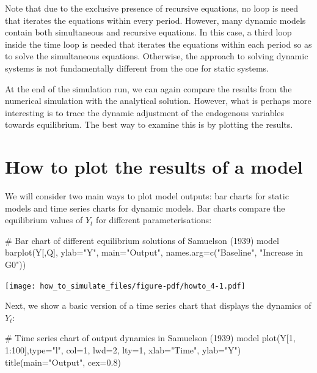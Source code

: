 \documentclass[
  letterpaper,
  DIV=11,
  numbers=noendperiod]{scrreprt}
\newenvironment{Shaded}{\begin{snugshade}}{\end{snugshade}}
\newcommand{\AttributeTok}[1]{\textcolor[rgb]{0.40,0.45,0.13}{#1}}
\newcommand{\CommentTok}[1]{\textcolor[rgb]{0.37,0.37,0.37}{#1}}
\newcommand{\DecValTok}[1]{\textcolor[rgb]{0.68,0.00,0.00}{#1}}
\newcommand{\FloatTok}[1]{\textcolor[rgb]{0.68,0.00,0.00}{#1}}
\newcommand{\FunctionTok}[1]{\textcolor[rgb]{0.28,0.35,0.67}{#1}}
\newcommand{\NormalTok}[1]{\textcolor[rgb]{0.00,0.23,0.31}{#1}}
\newcommand{\SpecialCharTok}[1]{\textcolor[rgb]{0.37,0.37,0.37}{#1}}
\newcommand{\StringTok}[1]{\textcolor[rgb]{0.13,0.47,0.30}{#1}}
\begin{document}
Note that due to the exclusive presence of recursive equations, no loop
is need that iterates the equations within every period. However, many
dynamic models contain both simultaneous and recursive equations. In
this case, a third loop inside the time loop is needed that iterates the
equations within each period so as to solve the simultaneous equations.
Otherwise, the approach to solving dynamic systems is not fundamentally
different from the one for static systems.

At the end of the simulation run, we can again compare the results from
the numerical simulation with the analytical solution. However, what is
perhaps more interesting is to trace the dynamic adjustment of the
endogenous variables towards equilibrium. The best way to examine this
is by plotting the results.

\section{How to plot the results of a
model}\label{how-to-plot-the-results-of-a-model}

We will consider two main ways to plot model outputs: bar charts for
static models and time series charts for dynamic models. Bar charts
compare the equilibrium values of \(Y_t\) for different
parameterisations:

\begin{Shaded}
\begin{Highlighting}[]
\CommentTok{\# Bar chart of different equilibrium solutions of Samuelson (1939) model}
\FunctionTok{barplot}\NormalTok{(Y[,Q], }\AttributeTok{ylab=}\StringTok{"Y"}\NormalTok{, }\AttributeTok{main=}\StringTok{"Output"}\NormalTok{, }\AttributeTok{names.arg=}\FunctionTok{c}\NormalTok{(}\StringTok{"Baseline"}\NormalTok{, }\StringTok{"Increase in G0"}\NormalTok{))}
\end{Highlighting}
\end{Shaded}

\texttt{[image: how\_to\_simulate\_files/figure-pdf/howto\_4-1.pdf]}

Next, we show a basic version of a time series chart that displays the
dynamics of \(Y_t\):

\begin{Shaded}
\begin{Highlighting}[]
\CommentTok{\# Time series chart of output dynamics in Samuelson (1939) model}
\FunctionTok{plot}\NormalTok{(Y[}\DecValTok{1}\NormalTok{, }\DecValTok{1}\SpecialCharTok{:}\DecValTok{100}\NormalTok{],}\AttributeTok{type=}\StringTok{"l"}\NormalTok{, }\AttributeTok{col=}\DecValTok{1}\NormalTok{, }\AttributeTok{lwd=}\DecValTok{2}\NormalTok{, }\AttributeTok{lty=}\DecValTok{1}\NormalTok{, }\AttributeTok{xlab=}\StringTok{"Time"}\NormalTok{, }\AttributeTok{ylab=}\StringTok{"Y"}\NormalTok{) }
\FunctionTok{title}\NormalTok{(}\AttributeTok{main=}\StringTok{"Output"}\NormalTok{, }\AttributeTok{cex=}\FloatTok{0.8}\NormalTok{)}
\end{Highlighting}
\end{Shaded}
\end{document}
